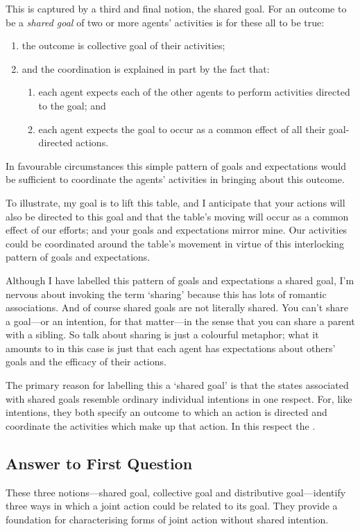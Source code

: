 \documentclass[12pt,a4paper]{extarticle}
\begin{document}
This is captured by a third and final notion, the shared goal.
For an outcome to be a \emph{shared goal} of two or more agents' activities is for these all to be true:
\begin{enumerate}
\item the outcome is collective goal of their activities;
\item and the coordination is explained in part by the fact that:
\begin{enumerate}
\item each agent expects each of the other agents to perform activities directed to the goal; and
\item each agent expects the goal to occur as a common effect of all their goal-directed actions.
\end{enumerate}
\end{enumerate}
%
In favourable circumstances this simple pattern of goals and expectations would be sufficient to coordinate the agents’ activities in bringing about this outcome. 

To illustrate, my goal is to lift this table, and I anticipate that your actions will also be directed to this goal and that the table's moving will occur as a common effect of our efforts; and your goals and expectations mirror mine.
Our activities could be coordinated around the table's movement in virtue of this interlocking pattern of goals and expectations. 

Although I have labelled this pattern of goals and expectations a shared goal, I'm nervous about invoking the term `sharing' because this has lots of romantic associations.  And of course shared goals are not literally shared.  You can't share a goal---or an intention, for that matter---in the sense that you can share a parent with a sibling.  So talk about sharing is just a colourful metaphor; what it amounts to in this case is just that each agent has expectations about others' goals and the efficacy of their actions.

The primary reason for labelling this a `shared goal' is that the states associated with shared goals resemble ordinary individual intentions in one respect.  For, like intentions, they both specify an outcome to which an action is directed and coordinate the activities which make up that action.  In this respect the .


\subsection{Answer to First Question}
These three notions---shared goal, collective goal and distributive goal---identify three ways in which a joint action could be related to its goal.
They provide a foundation for characterising forms of joint action without shared intention.
\end{document}
